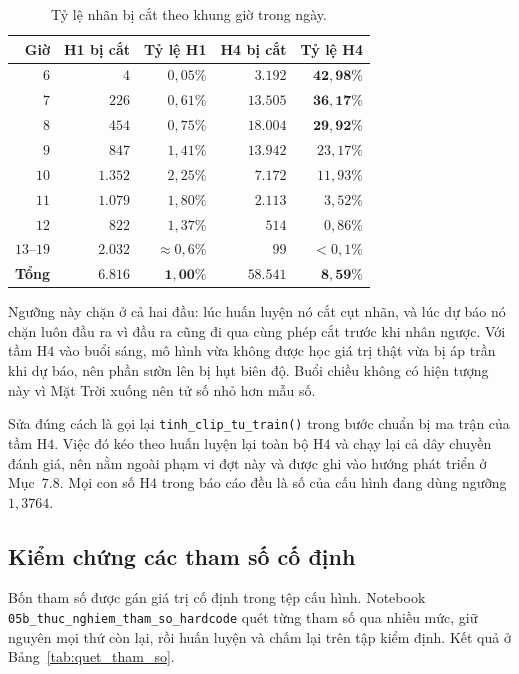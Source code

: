 \documentclass[12pt, a4paper]{report}
\begin{document}
\begin{table}[htbp]
\centering
\caption{Tỷ lệ nhãn bị cắt theo khung giờ trong ngày.}
\label{tab:cat_theo_gio}
\small
\begin{tabular}{r r r r r}
\toprule
\textbf{Giờ} & \textbf{H1 bị cắt} & \textbf{Tỷ lệ H1} & \textbf{H4 bị cắt} & \textbf{Tỷ lệ H4} \\
\midrule
$6$  & $4$     & $0{,}05\%$ & $3.192$  & $\mathbf{42{,}98\%}$ \\
$7$  & $226$   & $0{,}61\%$ & $13.505$ & $\mathbf{36{,}17\%}$ \\
$8$  & $454$   & $0{,}75\%$ & $18.004$ & $\mathbf{29{,}92\%}$ \\
$9$  & $847$   & $1{,}41\%$ & $13.942$ & $23{,}17\%$ \\
$10$ & $1.352$ & $2{,}25\%$ & $7.172$  & $11{,}93\%$ \\
$11$ & $1.079$ & $1{,}80\%$ & $2.113$  & $3{,}52\%$ \\
$12$ & $822$   & $1{,}37\%$ & $514$    & $0{,}86\%$ \\
$13$--$19$ & $2.032$ & $\approx 0{,}6\%$ & $99$ & $< 0{,}1\%$ \\
\midrule
\textbf{Tổng} & $\mathbf{6.816}$ & $\mathbf{1{,}00\%}$ & $\mathbf{58.541}$ & $\mathbf{8{,}59\%}$ \\
\bottomrule
\end{tabular}
\end{table}

Ngưỡng này chặn ở cả hai đầu: lúc huấn luyện nó cắt cụt nhãn, và lúc dự báo nó chặn luôn đầu
ra vì đầu ra cũng đi qua cùng phép cắt trước khi nhân ngược. Với tầm H$4$ vào buổi sáng, mô
hình vừa không được học giá trị thật vừa bị áp trần khi dự báo, nên phần sườn lên bị hụt biên
độ. Buổi chiều không có hiện tượng này vì Mặt Trời xuống nên tử số nhỏ hơn mẫu số.

Sửa đúng cách là gọi lại \texttt{tinh\_clip\_tu\_train()} trong bước chuẩn bị ma trận của tầm H$4$.
Việc đó kéo theo huấn luyện lại toàn bộ H$4$ và chạy lại cả dây chuyền đánh giá, nên nằm ngoài
phạm vi đợt này và được ghi vào hướng phát triển ở Mục~$7.8$. Mọi con số H$4$ trong báo cáo đều
là số của cấu hình đang dùng ngưỡng $1{,}3764$.

\FloatBarrier
\subsection{Kiểm chứng các tham số cố định}

Bốn tham số được gán giá trị cố định trong tệp cấu hình. Notebook
\texttt{05b\_thuc\_nghiem\_tham\_so\_hardcode} quét từng tham số qua nhiều mức, giữ nguyên mọi thứ
còn lại, rồi huấn luyện và chấm lại trên tập kiểm định. Kết quả ở Bảng~\ref{tab:quet_tham_so}.
\end{document}
